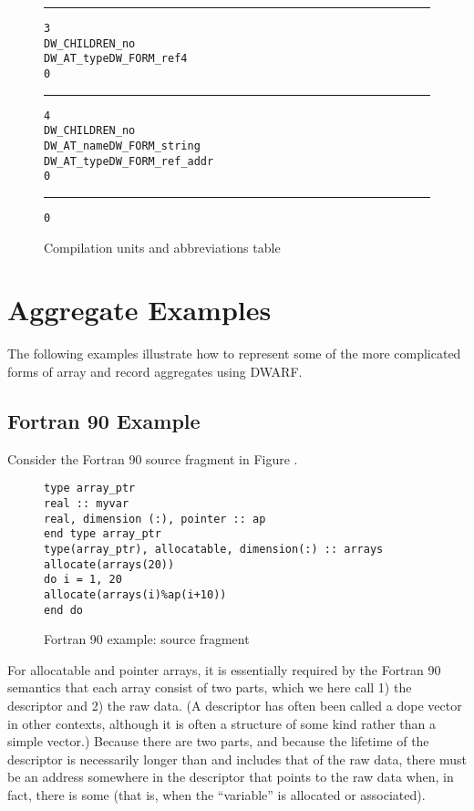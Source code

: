 \begin{figure}[here]
\begin{minipage}{0.4\textwidth}
\begin{framed}
\begin{alltt}
\hrule
3
DW\-\_CHILDREN\-\_no
DW\-\_AT\-\_type       DW\-\_FORM\-\_ref4
0
\vspace{0.01cm}
\hrule
4
DW\-\_CHILDREN\-\_no
DW\-\_AT\-\_name      DW\-\_FORM\-\_string
DW\-\_AT\-\_type      DW\-\_FORM\-\_ref\-\_addr
0
\vspace{0.01cm}
\hrule
0
\end{alltt}
\end{framed}
\end{minipage}
\caption{Compilation units and abbreviations table} \label{fig:compilationunitsandabbreviationstable}
\end{figure}

\clearpage

\section{Aggregate Examples}
\label{app:aggregateexamples}

The following examples illustrate how to represent some of
the more complicated forms of array and record aggregates
using DWARF.

\subsection{Fortran 90 Example}
\label{app:fortran90example}
Consider the Fortran 90 source fragment in 
Figure .

\begin{figure}[here]
\begin{lstlisting}
type array_ptr
real :: myvar
real, dimension (:), pointer :: ap
end type array_ptr
type(array_ptr), allocatable, dimension(:) :: arrays
allocate(arrays(20))
do i = 1, 20
allocate(arrays(i)%ap(i+10))
end do
\end{lstlisting}
\caption{Fortran 90 example: source fragment} \label{fig:fortran90examplesourcefragment}
\end{figure}

For allocatable and pointer arrays, it is essentially required
by the Fortran 90 semantics that each array consist of two
parts, which we here call 1) the descriptor and 2) the raw
data. (A descriptor has often been called a dope vector in
other contexts, although it is often a structure of some kind
rather than a simple vector.) Because there are two parts,
and because the lifetime of the descriptor is necessarily
longer than and includes that of the raw data, there must be
an address somewhere in the descriptor that points to the
raw data when, in fact, there is some (that is, when 
the ``variable'' is allocated or associated).

